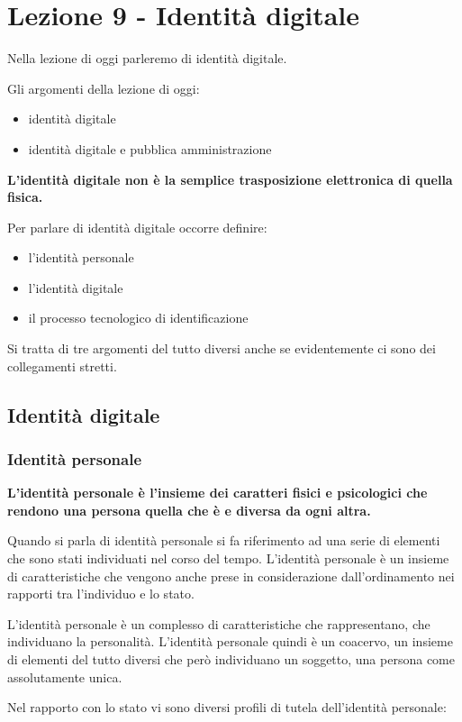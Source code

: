 \chapter{Lezione 9 - Identità digitale}

Nella lezione di oggi parleremo di identità digitale. 

Gli argomenti della lezione di oggi:
\begin{itemize}
    \item identità digitale 
    \item identità digitale e pubblica amministrazione 
\end{itemize}

\textbf{L'identità digitale non è la semplice trasposizione elettronica di quella fisica.} \par
Per parlare di identità digitale occorre definire:
\begin{itemize}
    \item l'identità personale 
    \item l'identità digitale
    \item il processo tecnologico di identificazione
\end{itemize}

Si tratta di tre argomenti del tutto diversi anche se evidentemente ci sono dei collegamenti stretti.

\section{Identità digitale}
\subsection{Identità personale}

\textbf{L'identità personale è l'insieme dei caratteri fisici e psicologici che rendono una persona quella che è e diversa da ogni altra.} \par
Quando si parla di identità personale si fa riferimento ad una serie di elementi che sono stati individuati nel corso del tempo. L'identità personale è un insieme di caratteristiche che vengono anche prese in considerazione dall'ordinamento nei rapporti tra l'individuo e lo stato.\par
L'identità personale è un complesso di caratteristiche che rappresentano, che individuano la personalità. L'identità personale quindi è un coacervo, un insieme di elementi del tutto diversi che però individuano un soggetto, una persona come assolutamente unica.\par
Nel rapporto con lo stato vi sono diversi profili di tutela dell'identità personale:

